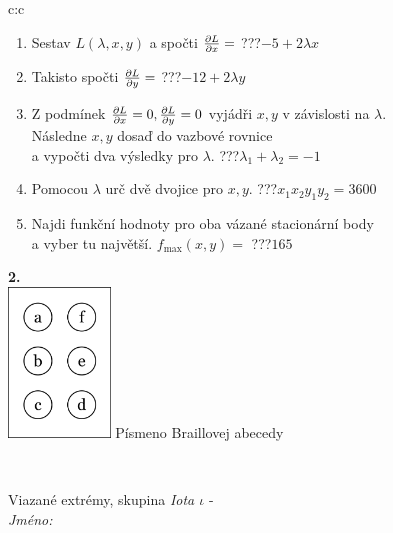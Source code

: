 \documentclass[10pt]{report}
\begin{document}
\begin{tabular}{c:c}
\begin{minipage}[c][104.5mm][t]{0.5\linewidth}
\begin{center}
\begin{minipage}{0.79\linewidth}
\begin{center}
\begin{varwidth}{\linewidth}
\begin{enumerate}
\item Sestav $L(\lambda,x,y)$ a spočti $\pdv{L}{x}=$\quad \dotfill\; ???\;\dotfill \quad $-5+2\lambda x$
\item Takisto spočti $\pdv{L}{y}=$\quad \dotfill\; ???\;\dotfill \quad $-12+2\lambda y$
\item Z podmínek $\pdv{L}{x}=0 , \pdv{L}{y}=0$ vyjádři $x,y$ v závislosti na $\lambda$.\\ \phantom{xxxxxx}Následne $x,y$ dosaď do vazbové rovnice\\ \phantom{xxxxxx}a vypočti dva výsledky pro $\lambda$.\quad \dotfill\; ???\;\dotfill \quad $\lambda_1+\lambda_2=-1$
\item Pomocou $\lambda$ urč dvě dvojice pro $x,y$.\quad \dotfill\; ???\;\dotfill \quad $x_1 x_2 y_1 y_2=3600$
\item Najdi funkční hodnoty pro oba vázané stacionární body\\ \phantom{xxxxxx}a vyber tu najvětší. $f_{\text{max}}(x,y)=$\quad \dotfill\; ???\;\dotfill \quad $165$
\end{enumerate}
\end{varwidth}
\end{center}
\end{minipage}
\begin{minipage}{0.20\linewidth}
\begin{center}
{\Huge\bfseries 2.} \\[2mm]
\includegraphics[height=40mm]{../images/braille.png}
{\small Písmeno Braillovej abecedy}
\end{center}
\end{minipage}
\end{center}
\end{minipage}
\\ \hdashline
\begin{minipage}[c][104.5mm][t]{0.5\linewidth}
\begin{center}
\vspace{7mm}
{\huge Viazané extrémy, skupina \textit{Iota $\iota$} -}\\[5mm]
\textit{Jméno:}\phantom{xxxxxxxxxxxxxxxxxxxxxxxxxxxxxxxxxxxxxxxxxxxxxxxxxxxxxxxxxxxxxxxxx}\\[5mm]

\end{center}
\end{minipage}
\end{tabular}
\end{document}
